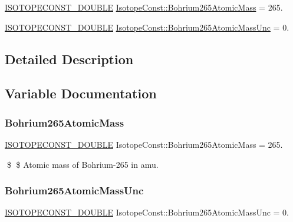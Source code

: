 \begin{DoxyCompactItemize}
\item 
\mbox{\hyperlink{group___isotope_const-_macros_ga8f45a7272ce02c0b4c65c44636ed719a}{I\+S\+O\+T\+O\+P\+E\+C\+O\+N\+S\+T\+\_\+\+D\+O\+U\+B\+LE}} \mbox{\hyperlink{group___isotope_const-_bohrium-_bh265_ga79315ed0d6e9d9affa9b422630e9eb7a}{Isotope\+Const\+::\+Bohrium265\+Atomic\+Mass}} = 265.
\item 
\mbox{\hyperlink{group___isotope_const-_macros_ga8f45a7272ce02c0b4c65c44636ed719a}{I\+S\+O\+T\+O\+P\+E\+C\+O\+N\+S\+T\+\_\+\+D\+O\+U\+B\+LE}} \mbox{\hyperlink{group___isotope_const-_bohrium-_bh265_ga44a7d0cbd088f9ce1614df29b9d13a10}{Isotope\+Const\+::\+Bohrium265\+Atomic\+Mass\+Unc}} = 0.
\end{DoxyCompactItemize}


\subsection{Detailed Description}


\subsection{Variable Documentation}
\mbox{\label{group___isotope_const-_bohrium-_bh265_ga79315ed0d6e9d9affa9b422630e9eb7a}} 
\subsubsection{\texorpdfstring{Bohrium265\+Atomic\+Mass}{Bohrium265AtomicMass}}
{\footnotesize\ttfamily \mbox{\hyperlink{group___isotope_const-_macros_ga8f45a7272ce02c0b4c65c44636ed719a}{I\+S\+O\+T\+O\+P\+E\+C\+O\+N\+S\+T\+\_\+\+D\+O\+U\+B\+LE}} Isotope\+Const\+::\+Bohrium265\+Atomic\+Mass = 265.}

\$ \$ Atomic mass of Bohrium-\/265 in amu. \mbox{\label{group___isotope_const-_bohrium-_bh265_ga44a7d0cbd088f9ce1614df29b9d13a10}} 
\subsubsection{\texorpdfstring{Bohrium265\+Atomic\+Mass\+Unc}{Bohrium265AtomicMassUnc}}
{\footnotesize\ttfamily \mbox{\hyperlink{group___isotope_const-_macros_ga8f45a7272ce02c0b4c65c44636ed719a}{I\+S\+O\+T\+O\+P\+E\+C\+O\+N\+S\+T\+\_\+\+D\+O\+U\+B\+LE}} Isotope\+Const\+::\+Bohrium265\+Atomic\+Mass\+Unc = 0.}

